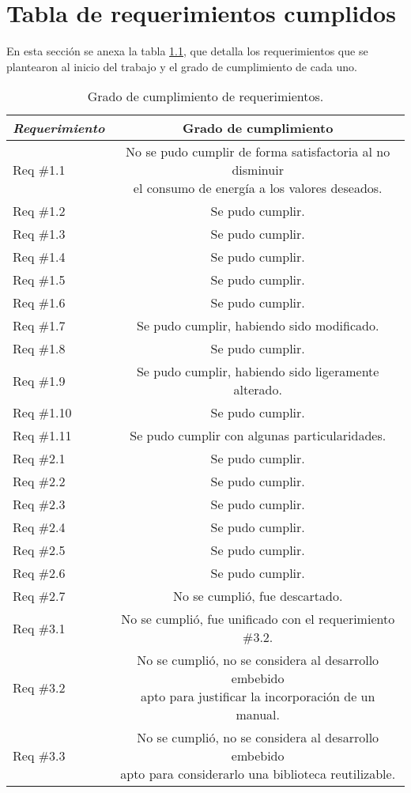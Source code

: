 
\chapter{Tabla de requerimientos cumplidos} %

\label{AppendixA} %

En esta sección se anexa la tabla \ref{tab:requerimientos}, que detalla los requerimientos que se plantearon al inicio del trabajo y el grado de cumplimiento de cada uno.

\begin{table}[H]
	\centering
	\caption{Grado de cumplimiento de requerimientos.}
	\begin{tabular}{l c}    
		\toprule
		\textbf{\textit{Requerimiento}} 	 & \textbf{Grado de cumplimiento} \\
		\midrule
		Req \#1.1 & \makecell{No se pudo cumplir de forma satisfactoria al no disminuir \\  el consumo de energía a los valores deseados.}    \\		
		Req \#1.2 & Se pudo cumplir.    \\	
		Req \#1.3 &   Se pudo cumplir.   \\	
		Req \#1.4 &   Se pudo cumplir.   \\	
		Req \#1.5 &  Se pudo cumplir.    \\	
		Req \#1.6 &  Se pudo cumplir.    \\	
		Req \#1.7 &  Se pudo cumplir, habiendo sido modificado.   \\	
		Req \#1.8 &  Se pudo cumplir.    \\	
		Req \#1.9 &  Se pudo cumplir, habiendo sido ligeramente alterado.   \\	
		Req \#1.10 & Se pudo cumplir.     \\	
		Req \#1.11 &  Se pudo cumplir con algunas particularidades.   \\	
		Req \#2.1 &  Se pudo cumplir.    \\	
		Req \#2.2 &   Se pudo cumplir.   \\	
		Req \#2.3 & Se pudo cumplir.    \\	
		Req \#2.4 &  Se pudo cumplir.    \\	
		Req \#2.5 & Se pudo cumplir.     \\	
		Req \#2.6 &  Se pudo cumplir.    \\	
		Req \#2.7 &  No se cumplió, fue descartado.   \\	
		Req \#3.1 &  No se cumplió, fue unificado con el requerimiento \#3.2.   \\	
		Req \#3.2 &  \makecell{No se cumplió, no se considera al desarrollo embebido \\ apto para justificar la incorporación de un manual.}  \\	
		Req \#3.3 &  \makecell{No se cumplió, no se considera al desarrollo embebido \\ apto para considerarlo una biblioteca reutilizable.}  \\	
		\bottomrule
		\hline
	\end{tabular}
	\label{tab:requerimientos}
\end{table}
